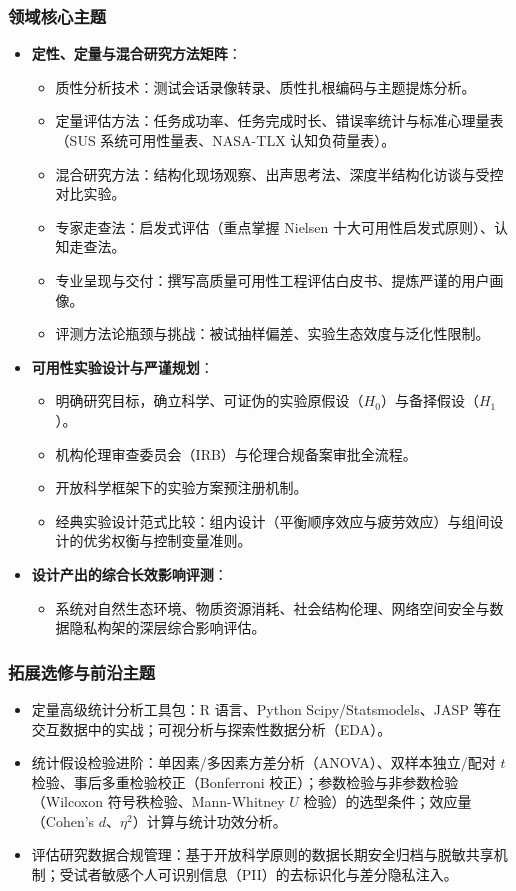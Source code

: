 \subsubsection{领域核心主题}
\begin{itemize}
    \item \textbf{定性、定量与混合研究方法矩阵}：
    \begin{itemize}
        \item 质性分析技术：测试会话录像转录、质性扎根编码与主题提炼分析。
        \item 定量评估方法：任务成功率、任务完成时长、错误率统计与标准心理量表（SUS 系统可用性量表、NASA-TLX 认知负荷量表）。
        \item 混合研究方法：结构化现场观察、出声思考法、深度半结构化访谈与受控对比实验。
        \item 专家走查法：启发式评估（重点掌握 Nielsen 十大可用性启发式原则）、认知走查法。
        \item 专业呈现与交付：撰写高质量可用性工程评估白皮书、提炼严谨的用户画像。
        \item 评测方法论瓶颈与挑战：被试抽样偏差、实验生态效度与泛化性限制。
    \end{itemize}
    \item \textbf{可用性实验设计与严谨规划}：
    \begin{itemize}
        \item 明确研究目标，确立科学、可证伪的实验原假设（$H_0$）与备择假设（$H_1$）。
        \item 机构伦理审查委员会（IRB）与伦理合规备案审批全流程。
        \item 开放科学框架下的实验方案预注册机制。
        \item 经典实验设计范式比较：组内设计（平衡顺序效应与疲劳效应）与组间设计的优劣权衡与控制变量准则。
    \end{itemize}
    \item \textbf{设计产出的综合长效影响评测}：
    \begin{itemize}
        \item 系统对自然生态环境、物质资源消耗、社会结构伦理、网络空间安全与数据隐私构架的深层综合影响评估。
    \end{itemize}
\end{itemize}

\subsubsection{拓展选修与前沿主题}
\begin{itemize}
    \item 定量高级统计分析工具包：R 语言、Python Scipy/Statsmodels、JASP 等在交互数据中的实战；可视分析与探索性数据分析（EDA）。
    \item 统计假设检验进阶：单因素/多因素方差分析（ANOVA）、双样本独立/配对 $t$ 检验、事后多重检验校正（Bonferroni 校正）；参数检验与非参数检验（Wilcoxon 符号秩检验、Mann-Whitney $U$ 检验）的选型条件；效应量（Cohen's $d$、$\eta^2$）计算与统计功效分析。
    \item 评估研究数据合规管理：基于开放科学原则的数据长期安全归档与脱敏共享机制；受试者敏感个人可识别信息（PII）的去标识化与差分隐私注入。
\end{itemize}

